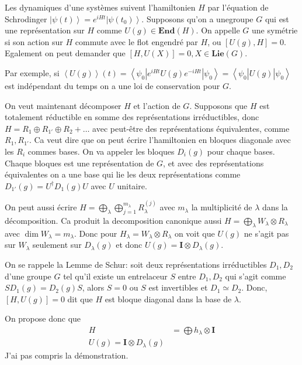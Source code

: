 \documentclass[10pt]{report}
\newcommand{\bra}[1]{\left<#1\right|}
\newcommand{\ket}[1]{\left|#1\right>}
\newcommand{\expvalue}[1]{\left<#1\right>}
\begin{document}
Les dynamiques d'une syst\`emes suivent l'hamiltonien $H$ par l'\'equation de Schrodinger $\ket{\psi(t)} = e^{iHt}\ket{\psi(t_0)}$. Supposons qu'on a unegroupe $G$ qui est une repr\'esentation sur $H$ comme $U(g) \in \mathbf{End}(H)$. On appelle $G$ une sym\'etrie si son action sur $H$ commute avec le flot engendr\'e par $H$, ou $\left[ U(g), H \right] = 0$. Egalement on peut demander que $[H,U(X)] = 0, X \in \mathbf{Lie}(G)$.

Par exemple, si $\expvalue{U(g)}(t) = \bra{\psi_0}e^{iHt}U(g)e^{-iHt}\ket{\psi_0} = \bra{\psi_0}U(g)\ket{\psi_0}$ est ind\'ependant du temps on a une loi de conservation pour $G$. 

On veut maintenant d\'ecomposer $H$ et l'action de $G$. Supposons que $H$ est totalement r\'eductible en somme des repr\'esentations irr\'eductibles, donc $H = R_1 \oplus R_{1'} \oplus R_2 +\dots$ avec peut-\^etre des repr\'esentations \'equivalentes, comme $R_1, R_{1'}$. Ca veut dire que on peut \'ecrire l'hamiltonien en bloques diagonale avec les $R_i$ commes bases. On va appeler les bloques $D_i(g)$ pour chaque bases. Chaque bloques est une repr\'esentation de $G$, et avec des repr\'esentations \'equivalentes on a une base qui lie les deux repr\'esentations comme $D_{1'}(g) = U^\dagger D_1(g)U$ avec $U$ unitaire.

On peut aussi \'ecrire $H = \bigoplus_\lambda \bigoplus_{j=1}^{m_\lambda} R_\lambda^{(j)}$ avec $m_\lambda$ la multiplicit\'e de $\lambda$ dans la d\'ecomposition. Ca produit la decomposition canonique aussi $H = \bigoplus_\lambda W_\lambda \otimes R_\lambda$ avec $\dim W_\lambda = m_\lambda$. Donc pour $H_\lambda = W_\lambda \otimes R_\lambda$ on voit que $U(g)$ ne s'agit pas sur $W_\lambda$ seulement sur $D_\lambda(g)$ et donc $U(g) = \mathbf{I} \otimes D_\lambda(g)$. 

On se rappele la Lemme de Schur: soit deux repr\'esentations irr\'eductibles $D_1, D_2$ d'une groupe $G$ tel qu'il existe un entrelaceur $S$ entre $D_1,D_2$ qui s'agit comme $SD_1(g) = D_2(g)S$, alors $S=0$ ou $S$ est invertibles et $D_1 \simeq D_2$. Donc, $[H, U(g)] = 0$ dit que $H$ est bloque diagonal dans la base de $\lambda$. 

On propose donc que 
\begin{align}
    H &= \bigoplus h_\lambda \otimes \mathbf{I}\label{07.10.H}\\
    U(g) = \mathbf{I} \otimes D_\lambda(g)
\end{align}
J'ai pas compris la d\'emonstration.
\end{document}
